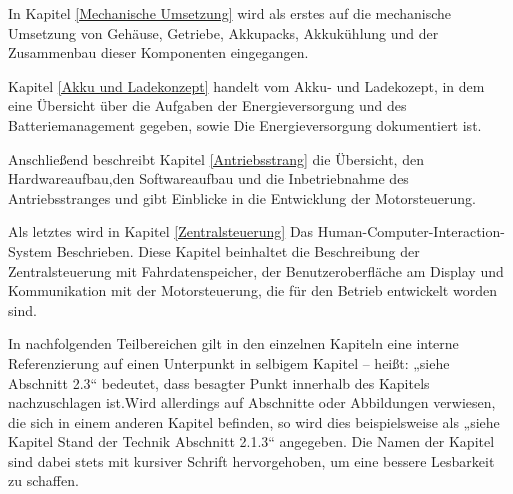 In Kapitel \ref{Mechanische Umsetzung} wird als erstes auf die mechanische Umsetzung von Gehäuse, Getriebe, Akkupacks, Akkukühlung und der Zusammenbau dieser Komponenten eingegangen. 

Kapitel \ref{Akku und Ladekonzept} handelt vom Akku- und Ladekozept, in dem eine Übersicht über die Aufgaben der Energieversorgung und des Batteriemanagement gegeben, sowie Die Energieversorgung dokumentiert ist. 

Anschließend beschreibt Kapitel \ref{Antriebsstrang} die Übersicht, den Hardwareaufbau,den Softwareaufbau und die Inbetriebnahme des Antriebsstranges und gibt Einblicke in die Entwicklung der Motorsteuerung. 

Als letztes wird in Kapitel \ref{Zentralsteuerung} Das Human-Computer-Interaction-System Beschrieben. Diese Kapitel beinhaltet die Beschreibung der Zentralsteuerung mit Fahrdatenspeicher, der Benutzeroberfläche am Display und Kommunikation mit der Motorsteuerung, die für den Betrieb entwickelt worden sind.

In nachfolgenden Teilbereichen gilt in den einzelnen Kapiteln eine interne Referenzierung auf einen Unterpunkt in selbigem Kapitel – heißt: „siehe Abschnitt 2.3“ bedeutet, dass besagter Punkt innerhalb des Kapitels nachzuschlagen ist.Wird allerdings auf Abschnitte oder Abbildungen verwiesen, die sich in einem anderen Kapitel befinden, so wird dies beispielsweise als „siehe Kapitel Stand der Technik Abschnitt 2.1.3“ angegeben. Die Namen der Kapitel sind dabei stets mit kursiver Schrift hervorgehoben, um eine bessere Lesbarkeit zu schaffen.